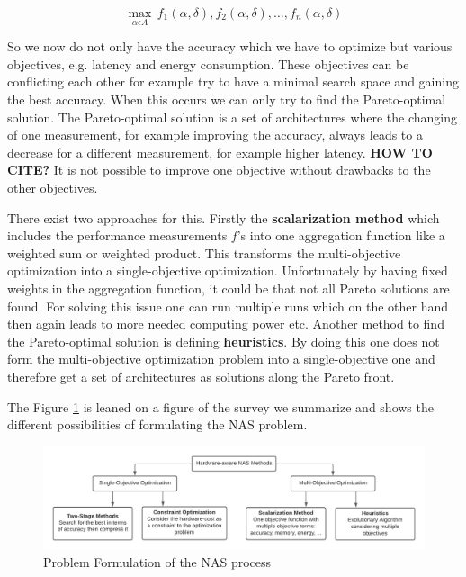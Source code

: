 \documentclass[conference]{IEEEtran}
\begin{document}
\begin{equation}
\label{eqn:multi-obj}
\max_{\alpha\epsilon A}\,f_{1}(\alpha, \delta),f_{2}(\alpha, \delta),\ldots ,f_{n}(\alpha, \delta)
\end{equation}     

So we now do not only have the accuracy which we have to optimize but various objectives, e.g. latency and energy consumption. These objectives can be conflicting each other for example try to have a minimal search space and gaining the best accuracy. When this occurs we can only try to find the Pareto-optimal solution. The Pareto-optimal solution is a set of architectures where the changing of one measurement, for example improving the accuracy, always leads to a decrease for a different measurement, for example higher latency. \textbf{HOW TO CITE?} It is not possible to improve one objective without drawbacks to the other objectives.

There exist two approaches for this. Firstly the \textbf{scalarization method} which includes the performance measurements $f$'s into one aggregation function like a weighted sum or weighted product. This transforms the multi-objective optimization into a single-objective optimization. Unfortunately by having fixed weights in the aggregation function, it could be that not all Pareto solutions are found. For solving this issue one can run multiple runs which on the other hand then again leads to more needed computing power etc. Another method to find the Pareto-optimal solution is defining \textbf{heuristics}. By doing this one does not form the multi-objective optimization problem into a single-objective one and therefore get a set of architectures as solutions along the Pareto front.

The Figure \ref{fig:ProblemFormulation} is leaned on a figure of the survey we summarize and shows the different possibilities of formulating the NAS problem.

\begin{figure}[htbp]
\includegraphics[width=\textwidth]{ProblemFormulation.png}
\caption{Problem Formulation of the NAS process \cite{bib1}}
\label{fig:ProblemFormulation}
\end{figure} 
\end{document}
